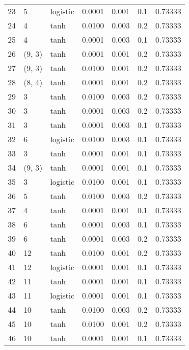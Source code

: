 \begin{tabular}{lllrrrr}
23  &           5 &  logistic &  0.0001 &  0.001 &  0.1 &   0.73333 \\
24  &           4 &      tanh &  0.0100 &  0.003 &  0.2 &   0.73333 \\
25  &           4 &      tanh &  0.0001 &  0.003 &  0.1 &   0.73333 \\
26  &      (9, 3) &      tanh &  0.0001 &  0.001 &  0.2 &   0.73333 \\
27  &      (9, 3) &      tanh &  0.0100 &  0.001 &  0.2 &   0.73333 \\
28  &      (8, 4) &      tanh &  0.0001 &  0.001 &  0.2 &   0.73333 \\
29  &           3 &      tanh &  0.0100 &  0.003 &  0.2 &   0.73333 \\
30  &           3 &      tanh &  0.0001 &  0.003 &  0.2 &   0.73333 \\
31  &           3 &      tanh &  0.0001 &  0.003 &  0.1 &   0.73333 \\
32  &           6 &  logistic &  0.0100 &  0.003 &  0.1 &   0.73333 \\
33  &           3 &      tanh &  0.0001 &  0.001 &  0.1 &   0.73333 \\
34  &      (9, 3) &      tanh &  0.0001 &  0.001 &  0.1 &   0.73333 \\
35  &           3 &  logistic &  0.0100 &  0.001 &  0.1 &   0.73333 \\
36  &           5 &      tanh &  0.0100 &  0.003 &  0.2 &   0.73333 \\
37  &           4 &      tanh &  0.0001 &  0.001 &  0.1 &   0.73333 \\
38  &           6 &      tanh &  0.0001 &  0.003 &  0.1 &   0.73333 \\
39  &           6 &      tanh &  0.0001 &  0.003 &  0.2 &   0.73333 \\
40  &          12 &      tanh &  0.0100 &  0.001 &  0.2 &   0.73333 \\
41  &          12 &  logistic &  0.0001 &  0.001 &  0.1 &   0.73333 \\
42  &          11 &      tanh &  0.0001 &  0.001 &  0.1 &   0.73333 \\
43  &          11 &  logistic &  0.0001 &  0.001 &  0.1 &   0.73333 \\
44  &          10 &      tanh &  0.0100 &  0.003 &  0.2 &   0.73333 \\
45  &          10 &      tanh &  0.0100 &  0.001 &  0.2 &   0.73333 \\
46  &          10 &      tanh &  0.0001 &  0.001 &  0.1 &   0.73333 \\

\end{tabular}

